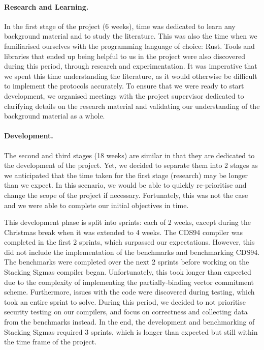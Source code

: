 

\paragraph{Research and Learning.} In the first stage of the project (6 weeks), time was dedicated 
to learn any background material and to study the literature. 
This was also the time when we familiarised ourselves with the programming language of choice: Rust. 
Tools and libraries that ended up being helpful to us in the project were also discovered during 
this period, through research and experimentation. It was imperative that we spent this time 
understanding the literature, as it would otherwise be difficult to implement the protocols accurately.
To ensure that we were ready to start development, we organised meetings with the 
project supervisor dedicated to clarifying details on the research material and validating 
our understanding of the background material as a whole.  

\paragraph{Development.} The second and third stages (18 weeks) are similar in that they are 
dedicated to the development of the project. Yet, we decided to separate them into 2 stages as 
we anticipated that the time taken for the first stage (research) may be longer than 
we expect. In this scenario, we would be able to quickly re-prioritise and change the scope of 
the project if necessary. Fortunately, this was not the case and we were able to complete 
our initial objectives in time. 

This development phase is split into sprints: each of 2 weeks, except during the Christmas break 
when it was extended to 4 weeks. The CDS94 compiler was completed in the first 2 sprints, 
which surpassed our expectations. However, this did not include the implementation of the 
benchmarks and benchmarking CDS94. The benchmarks were completed over the next 2 sprints 
before working on 
the Stacking Sigmas compiler began. Unfortunately, this took longer than expected due to the 
complexity of 
implementing the partially-binding vector commitment scheme. Furthermore, 
issues with the code were discovered during testing, which took an entire sprint to solve. 
During this period, we decided to not prioritise security testing on our compilers, and focus 
on correctness and collecting data from the benchmarks instead. In the end, the development and 
benchmarking of Stacking Sigmas required 3 sprints, which is longer than expected but still within 
the time frame of the project. 


